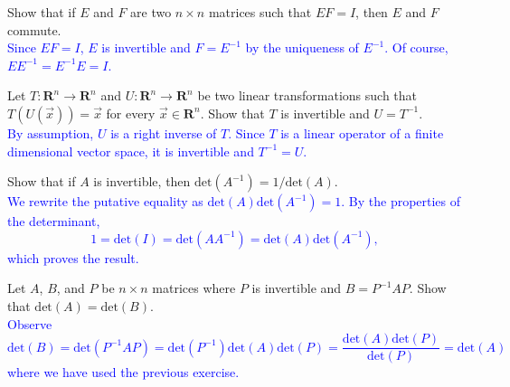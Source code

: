 \documentclass[a4paper,11pt]{article}
\newcommand{\R}{\mathbf{R}}
\newcommand{\BB}[1]{\textcolor{blue}{#1}}
\begin{document}
 Show that if $E$ and $F$ are two $n \times n$
matrices such that $EF=I$, then $E$ and $F$ commute.  \\

\BB{Since $EF = I$, $E$ is invertible and $F=E^{-1}$ by the uniqueness of
  $E^{-1}$. Of course, $EE^{-1} = E^{-1}E = I$. \\}

 Let $T : \R^n \rightarrow \R^n$ and $U : \R^n
\rightarrow \R^n$ be two linear transformations such that $T(U(\vec x))=\vec x$
for every $\vec x \in \R^n$. Show that $T$ is invertible and $U=T^{-1}$. \\

\BB{By assumption, $U$ is a right inverse of $T$. Since $T$ is a linear
  operator of a finite dimensional vector space, it is invertible and
  $T^{-1}=U$. \\}

 Show that if $A$ is invertible, then
$\text{det}(A^{-1}) = 1/\text{det}(A)$. \\

\BB{We rewrite the putative equality as $\text{det}(A)\text{det}(A^{-1})=1$. By
  the properties of the determinant,
  \[
    1 = \text{det}(I) = \text{det}(AA^{-1}) = \text{det}(A)\text{det}(A^{-1}),
  \]
  which proves the result. \\}

 Let $A$, $B$, and $P$ be $n \times n$ matrices
where $P$ is invertible and $B = P^{-1}AP$. Show that
$\text{det}(A)=\text{det}(B)$.  \\

\BB{Observe
  \[
    \text{det}(B) = \text{det}(P^{-1}AP) =
    \text{det}(P^{-1})\text{det}(A)\text{det}(P) =
    \frac{\text{det}(A)\text{det}(P)}{\text{det}(P)} = \text{det}(A)
  \]
  where we have used the previous exercise. \\}
\end{document}
